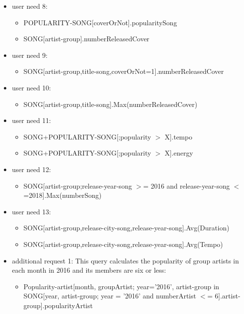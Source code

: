 \documentclass[12pt]{article}
\begin{document}
\begin{itemize}
\item user need 8:
\begin{itemize}
\item POPULARITY-SONG[coverOrNot].popularitySong
\item SONG[artist-group].numberReleasedCover
\end{itemize}
\item user need 9:
 \begin{itemize}
\item SONG[artist-group,title-song,coverOrNot=1].numberReleasedCover
\end{itemize}
\item user need 10:
\begin{itemize}
\item SONG[artist-group,title-song].Max(numberReleasedCover)
\end{itemize}
\item user need 11:
\begin{itemize}
\item SONG+POPULARITY-SONG[;popularity $>$ X].tempo
\item SONG+POPULARITY-SONG[;popularity $>$ X].energy
\end{itemize}
\item user need 12:
\begin{itemize}
\item SONG[artist-group;release-year-song $>$= 2016 and  \hfill \break 
release-year-song $<$=2018].Max(numberSong)
\end{itemize}
\item user need 13:
\begin{itemize}
\item SONG[artist-group,release-city-song,release-year-song].Avg(Duration)
\item SONG[artist-group,release-city-song,release-year-song].Avg(Tempo)
\end{itemize}
\item additional request 1: \hfill \break 
This query calculates the popularity of group artists in each month in 2016 and its members are six or less:
\begin{itemize}
\item Popularity-artist[month, groupArtist; year='2016', artist-group in SONG[year, artist-group; year = '2016' and numberArtist $<$= 6].artist-group].popularityArtist
\end{itemize}
\end{itemize}
\end{document}
